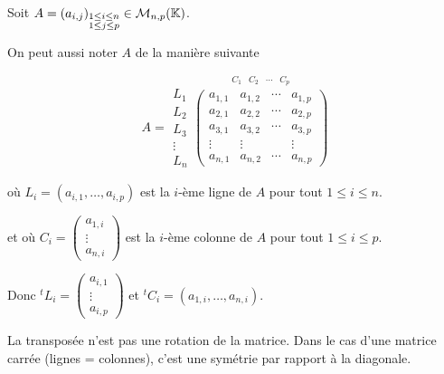 \documentclass[12pt, a4paper]{report}
\begin{document}
\begin{remark}
    Soit $A = (a_{i,j})_{\substack{1 \leq i \leq n\\ 1\leq j \leq p}} \in \mathcal M_{n,p}(\mathbb{K})$.
    

    On peut aussi noter $A$ de la manière suivante
    
        $$A = \begin{matrix}
            L_1 \\
            L_2 \\
            L_3 \\
            \vdots \\
            L_n
        \end{matrix}
        \overset{\begin{matrix} C_1 & C_2 & \cdots & C_p \end{matrix}}{\left(\begin{matrix}
        a_{1,1} & a_{1,2} & \cdots & a_{1,p}
        \\
        a_{2,1} & a_{2,2} & \cdots & a_{2,p}
        \\
        a_{3,1} & a_{3,2} & \cdots & a_{3,p}
        \\
        \vdots & \vdots & & \vdots
        \\
        a_{n,1} & a_{n,2} & \cdots & a_{n,p}
        \end{matrix}\right)}$$

    où $L_i = (a_{i,1},\dots,a_{i,p})$ est la $i$-ème ligne de $A$ pour tout $1 \leq i \leq n$.

    et où $C_i = \left(\begin{matrix} a_{1,i} \\ \vdots \\ a_{n,i} \end{matrix}\right)$ est la $i$-ème colonne de $A$ pour tout $1 \leq i \leq p$.

    Donc $^tL_i = \left(\begin{matrix} a_{i,1} \\ \vdots \\ a_{i,p} \end{matrix}\right)$ et $^tC_i = (a_{1,i},\dots,a_{n,i})$.
\end{remark}

\begin{attention}
    La transposée n'est pas une rotation de la matrice. Dans le cas d'une matrice carrée (lignes = colonnes), c'est une symétrie par rapport à la diagonale.
\end{attention}
\end{document}
